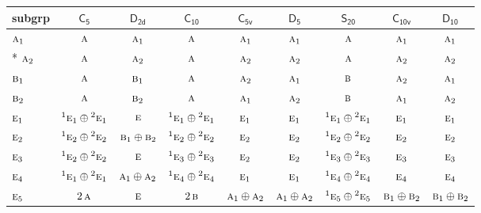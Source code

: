 \documentclass[10pt,a4paper]{article}
\numberwithin{equation}{section}
\newcommand{\grp}[1]{\mathsf{#1}}
\newcommand{\irr}[1]{\text{\normalfont\scshape #1}}
\newcommand{\conjpair}[1]{{}^{#1}}
\begin{document}
{\small\begin{longtable}{@{}lcccccccc@{}}\toprule
subgrp & \href{C5.pdf}{$\grp{C_{5}}$} & \href{D2d.pdf}{$\grp{D_{2d}}$} & \href{C10.pdf}{$\grp{C_{10}}$} & \href{C5v.pdf}{$\grp{C_{5v}}$} & \href{D5.pdf}{$\grp{D_{5}}$} & \href{S20.pdf}{$\grp{S_{20}}$} & \href{C10v.pdf}{$\grp{C_{10v}}$} & \href{D10.pdf}{$\grp{D_{10}}$}\\\midrule\endhead
\bottomrule\endfoot\endlastfoot
$\irr{a}_{1}$ & $\irr{a}$ & $\irr{a}_{1}$ & $\irr{a}$ & $\irr{a}_{1}$ & $\irr{a}_{1}$ & $\irr{a}$ & $\irr{a}_{1}$ & $\irr{a}_{1}$\\*
$\irr{a}_{2}$ & $\irr{a}$ & $\irr{a}_{2}$ & $\irr{a}$ & $\irr{a}_{2}$ & $\irr{a}_{2}$ & $\irr{a}$ & $\irr{a}_{2}$ & $\irr{a}_{2}$\\
$\irr{b}_{1}$ & $\irr{a}$ & $\irr{b}_{1}$ & $\irr{a}$ & $\irr{a}_{2}$ & $\irr{a}_{1}$ & $\irr{b}$ & $\irr{a}_{2}$ & $\irr{a}_{1}$\\
$\irr{b}_{2}$ & $\irr{a}$ & $\irr{b}_{2}$ & $\irr{a}$ & $\irr{a}_{1}$ & $\irr{a}_{2}$ & $\irr{b}$ & $\irr{a}_{1}$ & $\irr{a}_{2}$\\
$\irr{e}_{1}$ & $\conjpair{1}\irr{e}_{1}\oplus \conjpair{2}\irr{e}_{1}$ & $\irr{e}$ & $\conjpair{1}\irr{e}_{1}\oplus \conjpair{2}\irr{e}_{1}$ & $\irr{e}_{1}$ & $\irr{e}_{1}$ & $\conjpair{1}\irr{e}_{1}\oplus \conjpair{2}\irr{e}_{1}$ & $\irr{e}_{1}$ & $\irr{e}_{1}$\\
$\irr{e}_{2}$ & $\conjpair{1}\irr{e}_{2}\oplus \conjpair{2}\irr{e}_{2}$ & $\irr{b}_{1}\oplus \irr{b}_{2}$ & $\conjpair{1}\irr{e}_{2}\oplus \conjpair{2}\irr{e}_{2}$ & $\irr{e}_{2}$ & $\irr{e}_{2}$ & $\conjpair{1}\irr{e}_{2}\oplus \conjpair{2}\irr{e}_{2}$ & $\irr{e}_{2}$ & $\irr{e}_{2}$\\
$\irr{e}_{3}$ & $\conjpair{1}\irr{e}_{2}\oplus \conjpair{2}\irr{e}_{2}$ & $\irr{e}$ & $\conjpair{1}\irr{e}_{3}\oplus \conjpair{2}\irr{e}_{3}$ & $\irr{e}_{2}$ & $\irr{e}_{2}$ & $\conjpair{1}\irr{e}_{3}\oplus \conjpair{2}\irr{e}_{3}$ & $\irr{e}_{3}$ & $\irr{e}_{3}$\\
$\irr{e}_{4}$ & $\conjpair{1}\irr{e}_{1}\oplus \conjpair{2}\irr{e}_{1}$ & $\irr{a}_{1}\oplus \irr{a}_{2}$ & $\conjpair{1}\irr{e}_{4}\oplus \conjpair{2}\irr{e}_{4}$ & $\irr{e}_{1}$ & $\irr{e}_{1}$ & $\conjpair{1}\irr{e}_{4}\oplus \conjpair{2}\irr{e}_{4}$ & $\irr{e}_{4}$ & $\irr{e}_{4}$\\
$\irr{e}_{5}$ & $2\,\irr{a}$ & $\irr{e}$ & $2\,\irr{b}$ & $\irr{a}_{1}\oplus \irr{a}_{2}$ & $\irr{a}_{1}\oplus \irr{a}_{2}$ & $\conjpair{1}\irr{e}_{5}\oplus \conjpair{2}\irr{e}_{5}$ & $\irr{b}_{1}\oplus \irr{b}_{2}$ & $\irr{b}_{1}\oplus \irr{b}_{2}$\\

\end{longtable}}
\end{document}
